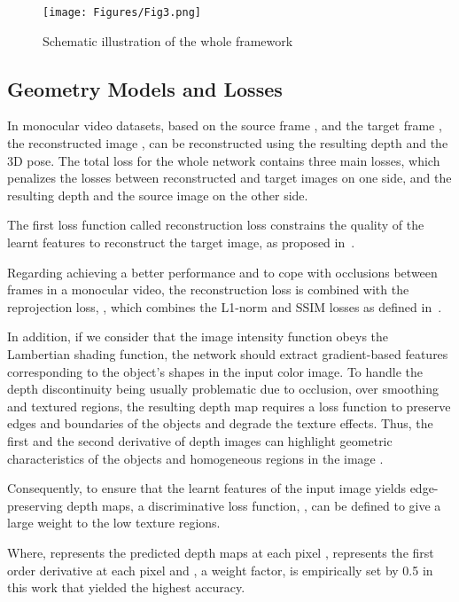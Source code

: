 \documentclass[journal]{IEEEtran}
\begin{document}
\begin{figure}[h]
\centering\texttt{[image: Figures/Fig3.png]}
\caption{Schematic illustration of the whole framework}
\label{fig3}
\end{figure}

\subsection{Geometry Models and Losses}
In monocular video datasets, based on the source frame , and the target frame , the reconstructed image , can be reconstructed using the resulting depth and the 3D pose. The total loss for the whole network contains three main losses, which penalizes the losses between reconstructed and target images on one side, and the resulting depth and the source image on the other side. 

The first loss function called reconstruction loss  constrains the quality of the learnt features to reconstruct the target image, as proposed in~\cite{Godard2018}.



Regarding achieving a better performance and to cope with occlusions between frames in a monocular video, the reconstruction loss  is combined with the reprojection loss, , which combines the L1-norm and SSIM losses as defined in~\cite{Godard2017}. 


In addition, if we consider that the image intensity function obeys the Lambertian shading function, the network should extract gradient-based features corresponding to the object’s shapes in the input color image. To handle the depth discontinuity being usually problematic due to occlusion, over smoothing and textured regions, the resulting depth map requires a loss function to preserve edges and boundaries of the objects and degrade the texture effects. Thus, the first and the second derivative of depth images can highlight geometric characteristics of the objects and homogeneous regions in the image \cite{Rashwan2019}.

Consequently, to ensure that the learnt features of the input image yields edge-preserving depth maps, a discriminative loss function, , can be defined to give a large weight to the low texture regions. 


Where,  represents the predicted depth maps at each pixel ,  represents the first order derivative at each pixel  and , a weight factor, is empirically set by 0.5 in this work that yielded the highest accuracy.
\end{document}
